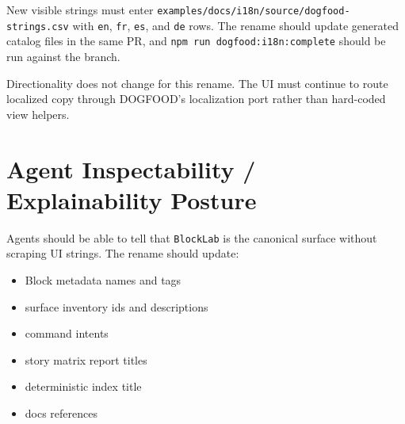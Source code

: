 New visible strings must enter \texttt{e\allowbreak{}x\allowbreak{}a\allowbreak{}m\allowbreak{}p\allowbreak{}l\allowbreak{}e\allowbreak{}s\allowbreak{}/\allowbreak{}d\allowbreak{}o\allowbreak{}c\allowbreak{}s\allowbreak{}/\allowbreak{}i\allowbreak{}1\allowbreak{}8\allowbreak{}n\allowbreak{}/\allowbreak{}s\allowbreak{}o\allowbreak{}u\allowbreak{}r\allowbreak{}c\allowbreak{}e\allowbreak{}/\allowbreak{}d\allowbreak{}o\allowbreak{}g\allowbreak{}f\allowbreak{}o\allowbreak{}o\allowbreak{}d\allowbreak{}-\allowbreak{}s\allowbreak{}t\allowbreak{}r\allowbreak{}i\allowbreak{}n\allowbreak{}g\allowbreak{}s\allowbreak{}.\allowbreak{}c\allowbreak{}s\allowbreak{}v} with \texttt{e\allowbreak{}n}, \texttt{f\allowbreak{}r}, \texttt{e\allowbreak{}s}, and \texttt{d\allowbreak{}e} rows. The rename should update generated catalog files in the same PR, and \texttt{n\allowbreak{}p\allowbreak{}m\allowbreak{} \allowbreak{}r\allowbreak{}u\allowbreak{}n\allowbreak{} \allowbreak{}d\allowbreak{}o\allowbreak{}g\allowbreak{}f\allowbreak{}o\allowbreak{}o\allowbreak{}d\allowbreak{}:\allowbreak{}i\allowbreak{}1\allowbreak{}8\allowbreak{}n\allowbreak{}:\allowbreak{}c\allowbreak{}o\allowbreak{}m\allowbreak{}p\allowbreak{}l\allowbreak{}e\allowbreak{}t\allowbreak{}e} should be run against the branch.

Directionality does not change for this rename. The UI must continue to route localized copy through DOGFOOD's localization port rather than hard-coded view helpers.

\section{Agent Inspectability / Explainability Posture}\label{record-134-agent-inspectability-explainability-posture}

Agents should be able to tell that \texttt{B\allowbreak{}l\allowbreak{}o\allowbreak{}c\allowbreak{}k\allowbreak{}L\allowbreak{}a\allowbreak{}b} is the canonical surface without scraping UI strings. The rename should update:

\begin{itemize}
\tightlist
\item
  Block metadata names and tags
\item
  surface inventory ids and descriptions
\item
  command intents
\item
  story matrix report titles
\item
  deterministic index title
\item
  docs references
\end{itemize}

